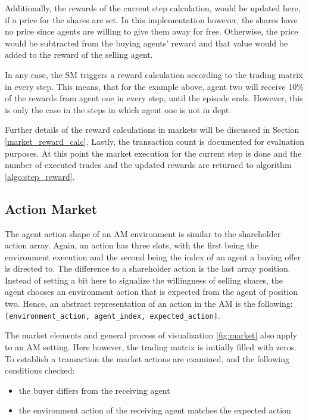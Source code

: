 Additionally, the rewards of the current step calculation, would be updated here, if a price for the shares are set. In this implementation however, the shares have no price since agents are willing to give them away for free. Otherwise, the price would be subtracted from the buying agents' reward and that value would be added to the reward of the selling agent. 

In any case, the SM triggers a reward calculation according to the trading matrix in every step. This means, that for the example above, agent two will receive 10\% of the rewards from agent one in every step, until the episode ends. However, this is only the case in the steps in which agent one is not in dept.

Further details of the reward calculations in markets will be discussed in Section \ref{market_reward_calc}. Lastly, the transaction count is documented for evaluation purposes. At this point the market execution for the current step is done and the number of executed trades and the updated rewards are returned to algorithm \ref{algo:step_reward}.

\subsection{Action Market}
The agent action shape of an AM environment is similar to the shareholder action array. Again, an action has three slots, with the first being the environment execution and the second being the index of an agent a buying offer is directed to. The difference to a shareholder action is the last array position. Instead of setting a bit here to signalize the willingness of selling shares, the agent chooses an environment action that is expected from the agent of position two. Hence, an abstract representation of an action in the AM is the following: \verb|[environment_action, agent_index, expected_action]|.

The market elements and general process of visualization \ref{fig:market} also apply to an AM setting. Here however, the trading matrix is initially filled with zeros. 
To establish a transaction the market actions are examined, and the following conditions checked:
\begin{itemize}
    \item the buyer differs from the receiving agent
    \item the environment action of the receiving agent matches the expected action
\end{itemize}

